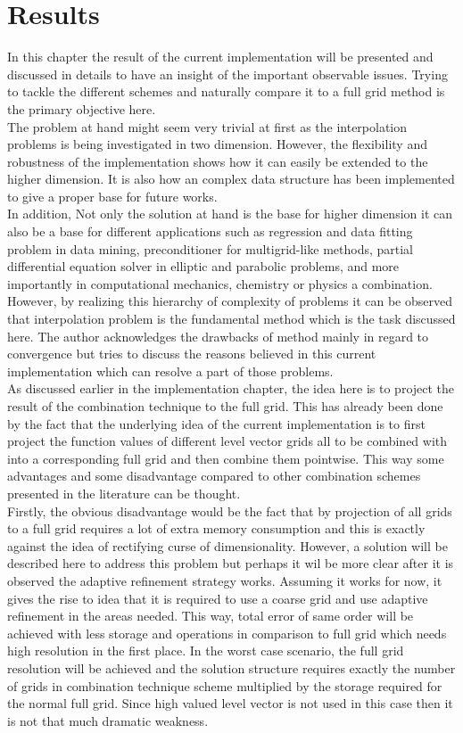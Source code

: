\chapter{Results}
\label{chapter:results}
In this chapter the result of the current implementation will be presented and discussed in details to have an insight of the important observable issues. Trying to tackle the different schemes and naturally compare it to a full grid method is the primary objective here. \\
The problem at hand might seem very trivial at first as the interpolation problems is being investigated in two dimension. However, the flexibility and robustness of the implementation shows how it can easily be extended to the higher dimension. It is also how an complex data structure has been implemented to give a proper base for future works.\\
In addition, Not only the solution at hand is the base for higher dimension it can also be a base for different applications such as regression and data fitting problem in data mining, preconditioner for multigrid-like methods, partial differential equation solver in elliptic and parabolic problems, and more importantly in computational mechanics, chemistry or physics a combination. However, by realizing this hierarchy of complexity of problems it can be observed that interpolation problem is the fundamental method which is the task discussed here. The author acknowledges the drawbacks of method mainly in regard to convergence but tries to discuss the reasons believed in this current implementation which can resolve a part of those problems.\\
As discussed earlier in the implementation chapter, the idea here is to project the result of the combination technique to the full grid. This has already been done by the fact that the underlying idea of the current implementation is to first project the function values of different level vector grids all to be combined with into a corresponding full grid and then combine them pointwise. This way some advantages and some disadvantage compared to other combination schemes presented in the literature can be thought. \\
Firstly, the obvious disadvantage would be the fact that by projection of all grids to a full grid requires a lot of extra memory consumption and this is exactly against the idea of rectifying curse of dimensionality. However, a solution will be described here to address this problem but perhaps it wil be more clear after it is observed the adaptive refinement strategy works. Assuming it works for now, it gives the rise to idea that it is required to use a coarse grid and use adaptive refinement in the areas needed. This way, total error of same order will be achieved with less storage and operations in comparison to full grid which needs high resolution in the first place. In the worst case scenario, the full grid resolution will be achieved and the solution structure requires exactly the number of grids in combination technique scheme multiplied by the storage required for the normal full grid. Since high valued level vector is not used in this case then it is not that much dramatic weakness.\\
